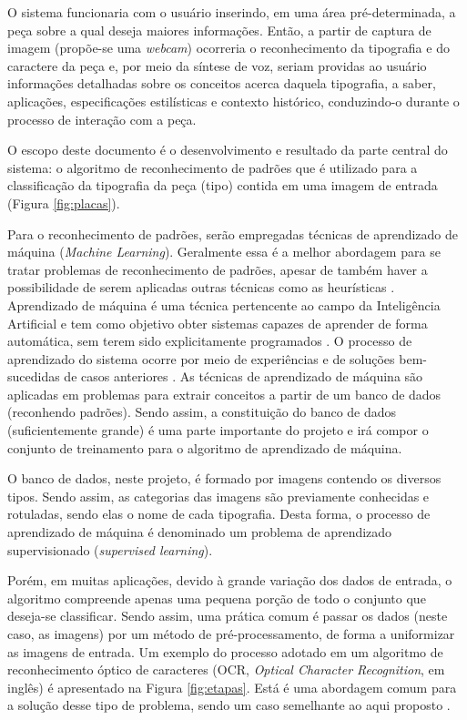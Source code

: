 O sistema funcionaria com o usuário inserindo, em uma área pré-determinada, a peça sobre a qual deseja maiores informações. Então, a partir de captura de imagem (propõe-se uma \textit{webcam}) ocorreria o reconhecimento da tipografia e do caractere da peça e, por meio da síntese de voz, seriam providas ao usuário informações detalhadas sobre os conceitos acerca daquela tipografia, a saber, aplicações, especificações estilísticas e contexto histórico, conduzindo-o durante o processo de interação com a peça.

O escopo deste documento é o desenvolvimento e resultado da parte central do sistema: o algoritmo de reconhecimento de padrões que é utilizado para a classificação da tipografia da peça (tipo) contida em uma imagem de entrada (Figura \ref{fig:placas}).

Para o reconhecimento de padrões, serão empregadas técnicas de aprendizado de máquina (\textit{Machine Learning}). Geralmente essa é a melhor abordagem para se tratar problemas de reconhecimento de padrões, apesar de também haver a possibilidade de serem aplicadas outras técnicas como as heurísticas . Aprendizado de máquina é uma técnica pertencente ao campo da Inteligência Artificial e tem como objetivo obter sistemas capazes de aprender de forma automática, sem terem sido explicitamente programados  . O processo de aprendizado do sistema ocorre por meio de experiências e de soluções bem-sucedidas de casos anteriores . As técnicas de aprendizado de máquina são aplicadas em problemas para extrair conceitos a partir de um banco de dados (reconhendo padrões). Sendo assim, a constituição do banco de dados (suficientemente grande) é uma parte importante do projeto e irá compor o conjunto de treinamento para o algoritmo de aprendizado de máquina.

O banco de dados, neste projeto, é formado por imagens contendo os diversos tipos. Sendo assim, as categorias das imagens são previamente conhecidas e rotuladas, sendo elas o nome de cada tipografia. Desta forma, o processo de aprendizado de máquina é denominado um problema de aprendizado supervisionado (\textit{supervised learning}).

Porém, em muitas aplicações, devido à grande variação dos dados de entrada, o algoritmo compreende apenas uma pequena porção de todo o conjunto que deseja-se classificar. Sendo assim, uma prática comum é passar os dados (neste caso, as imagens) por um método de pré-processamento, de forma a uniformizar as imagens de entrada. Um exemplo do processo adotado em um algoritmo de reconhecimento óptico de caracteres (OCR, \textit{Optical Character Recognition}, em inglês) é apresentado na Figura \ref{fig:etapas}. Está é uma abordagem comum para a solução desse tipo de problema, sendo um caso semelhante ao aqui proposto  .

